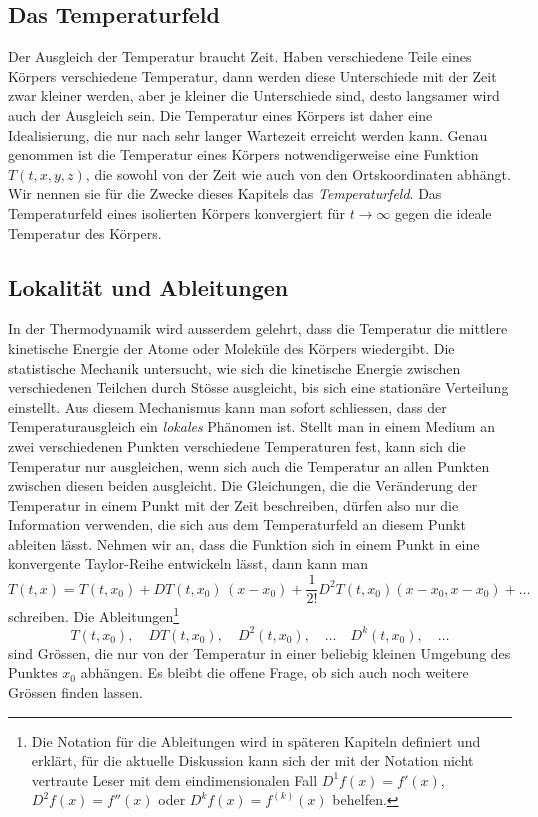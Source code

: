 \subsection{Das Temperaturfeld}
Der Ausgleich der Temperatur braucht Zeit.
Haben verschiedene Teile eines Körpers verschiedene Temperatur, dann
werden diese Unterschiede mit der Zeit zwar kleiner werden, aber je
kleiner die Unterschiede sind, desto langsamer wird auch der Ausgleich sein.
Die Temperatur eines Körpers ist daher eine Idealisierung, die nur
nach sehr langer Wartezeit erreicht werden kann.
Genau genommen ist die Temperatur eines Körpers notwendigerweise eine
Funktion $T(t,x,y,z)$, die sowohl von der Zeit wie auch von den
Ortskoordinaten abhängt.
Wir nennen sie für die Zwecke dieses Kapitels das {\em Temperaturfeld}.
%
Das Temperaturfeld eines isolierten Körpers konvergiert für
$t\to\infty$ gegen die ideale Temperatur des Körpers.

%
%
\subsection{Lokalität und Ableitungen}
In der Thermodynamik wird ausserdem gelehrt, dass die Temperatur die
%
mittlere kinetische Energie der Atome oder Moleküle des Körpers wiedergibt.
Die statistische Mechanik untersucht, wie sich die kinetische Energie
zwischen verschiedenen Teilchen durch Stösse ausgleicht, bis sich eine
stationäre Verteilung einstellt.
Aus diesem Mechanismus kann man sofort schliessen, dass der
Temperaturausgleich ein {\em lokales} Phänomen ist.
%
Stellt man in einem Medium an zwei verschiedenen Punkten verschiedene
Temperaturen fest, kann sich die Temperatur nur ausgleichen, wenn
sich auch die Temperatur an allen Punkten zwischen diesen beiden
ausgleicht.
Die Gleichungen, die die Veränderung der Temperatur in einem Punkt
mit der Zeit beschreiben, dürfen also nur die Information verwenden,
die sich aus dem Temperaturfeld an diesem Punkt ableiten lässt.
Nehmen wir an, dass die Funktion sich in einem Punkt in eine konvergente
Taylor-Reihe entwickeln lässt, dann kann man
%
\[
T(t,x)
=
T(t,x_0) + DT(t,x_0)\, (x-x_0) + \frac{1}{2!} D^2T(t,x_0)(x-x_0,x-x_0) + \dots
\]
schreiben.
Die Ableitungen\footnote{Die Notation für die Ableitungen wird
in späteren Kapiteln definiert und erklärt, für die aktuelle Diskussion
kann sich der mit der Notation nicht vertraute Leser mit dem eindimensionalen
Fall $D^1f(x) = f'(x)$, $D^2f(x) = f''(x)$ oder $D^kf(x)=f^{(k)}(x)$ behelfen.}
\[
T(t,x_0), \quad
DT(t,x_0), \quad
D^2(t,x_0),\quad \dots\quad
D^k(t,x_0),\quad\dots
\]
sind Grössen, die nur von der Temperatur in einer beliebig kleinen
Umgebung des Punktes $x_0$ abhängen.
Es bleibt die offene Frage, ob sich auch noch weitere Grössen finden lassen.


